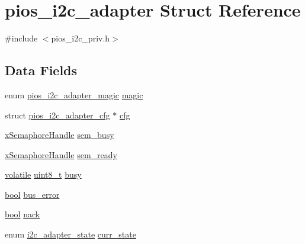 \hypertarget{structpios__i2c__adapter}{\section{pios\-\_\-i2c\-\_\-adapter Struct Reference}
\label{structpios__i2c__adapter}
}


{\ttfamily \#include $<$pios\-\_\-i2c\-\_\-priv.\-h$>$}

\subsection*{Data Fields}
\begin{DoxyCompactItemize}
\item 
enum \hyperlink{pios__i2c__priv_8h_af5ae4a1b83b5404462787136ee41be24}{pios\-\_\-i2c\-\_\-adapter\-\_\-magic} \hyperlink{structpios__i2c__adapter_a07891f689e89b36732affa16c1c3bf94}{magic}
\item 
struct \hyperlink{structpios__i2c__adapter__cfg}{pios\-\_\-i2c\-\_\-adapter\-\_\-cfg} $\ast$ \hyperlink{structpios__i2c__adapter_a99a6a40ff53546cd3f5a316a621be402}{cfg}
\item 
\hyperlink{_common_2_libraries_2_free_r_t_o_s_2_source_2include_2semphr_8h_aa91aa1b6835a184838f9ccf138a6ad10}{x\-Semaphore\-Handle} \hyperlink{structpios__i2c__adapter_ae21b610793f476b61cedafa82fffc493}{sem\-\_\-busy}
\item 
\hyperlink{_common_2_libraries_2_free_r_t_o_s_2_source_2include_2semphr_8h_aa91aa1b6835a184838f9ccf138a6ad10}{x\-Semaphore\-Handle} \hyperlink{structpios__i2c__adapter_a8a95bc22396c17869efa5a587a1bd5dc}{sem\-\_\-ready}
\item 
\hyperlink{group___c_m_s_i_s___core___instruction_interface_gad7d93af13046b0378601b85c8c16673b}{volatile} \hyperlink{stdint_8h_aba7bc1797add20fe3efdf37ced1182c5}{uint8\-\_\-t} \hyperlink{structpios__i2c__adapter_a25823130023ae773a53a858647b65fbb}{busy}
\item 
\hyperlink{group___exported__types_gaf6a258d8f3ee5206d682d799316314b1}{bool} \hyperlink{structpios__i2c__adapter_a98b74dc40da65289c18494530b759724}{bus\-\_\-error}
\item 
\hyperlink{group___exported__types_gaf6a258d8f3ee5206d682d799316314b1}{bool} \hyperlink{structpios__i2c__adapter_a22998be1ea282fe23fcd44c2b559c987}{nack}
\item 
enum \hyperlink{pios__i2c__priv_8h_ac73b69ffe53544057fa2e4751fd9c22b}{i2c\-\_\-adapter\-\_\-state} \hyperlink{structpios__i2c__adapter_ac619064c9dc42d3057f2188f188d5ee3}{curr\-\_\-state}

\end{DoxyCompactItemize}

